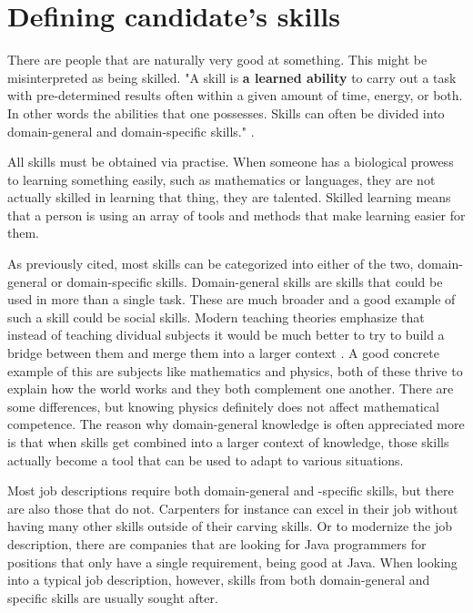 \documentclass[11pt,a4paper,oneside,article]{memoir}
\begin{document}
\section{Defining candidate's skills}

There are people that are naturally very good at something. This might be misinterpreted as being skilled. "A skill is \textbf{a learned ability} to carry out a task with pre-determined results often within a given amount of time, energy, or both. In other words the abilities that one possesses. Skills can often be divided into domain-general and domain-specific skills." \cite[p. ~4]{howland:book}.

All skills must be obtained via practise. When someone has a biological prowess to learning something easily, such as mathematics or languages, they are not actually skilled in learning that thing, they are talented. Skilled learning means that a person is using an array of tools and methods that make learning easier for them.

As previously cited, most skills can be categorized into either of the two, domain-general or domain-specific skills. Domain-general skills are skills that could be used in more than a single task. These are much broader and a good example of such a skill could be social skills. Modern teaching theories emphasize that instead of teaching dividual subjects it would be much better to try to build a bridge between them and merge them into a larger context \cite{mansoor:article}. A good concrete example of this are subjects like mathematics and physics, both of these thrive to explain how the world works and they both complement one another. There are some differences, but knowing physics definitely does not affect mathematical competence. The reason why domain-general knowledge is often appreciated more is that when skills get combined into a larger context of knowledge, those skills actually become a tool that can be used to adapt to various situations.

Most job descriptions require both domain-general and -specific skills, but there are also those that do not. Carpenters for instance can excel in their job without having many other skills outside of their carving skills. Or to modernize the job description, there are companies that are looking for Java programmers for positions that only have a single requirement, being good at Java. When looking into a typical job description, however, skills from both domain-general and specific skills are usually sought after.
\end{document}

